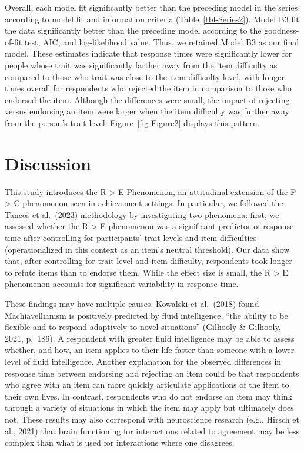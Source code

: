 \documentclass[
  number]{elsarticle}
\begin{document}
Overall, each model fit significantly better than the preceding model in
the series according to model fit and information criteria
(Table~\ref{tbl-Series2}). Model B3 fit the data significantly better
than the preceding model according to the goodness-of-fit test, AIC, and
log-likelihood value. Thus, we retained Model B3 as our final model.
These estimates indicate that response times were significantly lower
for people whose trait was significantly farther away from the item
difficulty as compared to those who trait was close to the item
difficulty level, with longer times overall for respondents who rejected
the item in comparison to those who endorsed the item. Although the
differences were small, the impact of rejecting versus endorsing an item
were larger when the item difficulty was further away from the person's
trait level. Figure~\ref{fig-Figure2} displays this pattern.

\section{Discussion}\label{discussion}

This study introduces the R \textgreater{} E Phenomenon, an attitudinal
extension of the F \textgreater{} C phenomenon seen in achievement
settings. In particular, we followed the Tancoš et al.~(2023)
methodology by investigating two phenomena: first, we assessed whether
the R \textgreater{} E phenomenon was a significant predictor of
response time after controlling for participants' trait levels and item
difficulties (operationalized in this context as an item's neutral
threshold). Our data show that, after controlling for trait level and
item difficulty, respondents took longer to refute items than to endorse
them. While the effect size is small, the R \textgreater{} E phenomenon
accounts for significant variability in response time.

These findings may have multiple causes. Kowalski et al.~(2018) found
Machiavellianism is positively predicted by fluid intelligence, ``the
ability to be flexible and to respond adaptively to novel situations''
(Gilhooly \& Gilhooly, 2021, p.~186). A respondent with greater fluid
intelligence may be able to assess whether, and how, an item applies to
their life faster than someone with a lower level of fluid intelligence.
Another explanation for the observed differences in response time
between endorsing and rejecting an item could be that respondents who
agree with an item can more quickly articulate applications of the item
to their own lives. In contrast, respondents who do not endorse an item
may think through a variety of situations in which the item may apply
but ultimately does not. These results may also correspond with
neuroscience research (e.g., Hirsch et al., 2021) that brain functioning
for interactions related to agreement may be less complex than what is
used for interactions where one disagrees.
\end{document}
